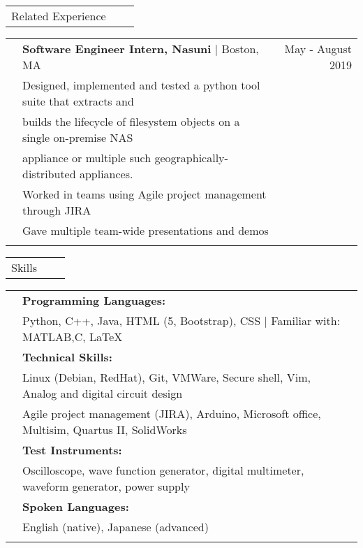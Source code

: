 \documentclass[letterpaper,10pt,oneside]{article}
\begin{document}
\noindent \begin{tabularx}{\linewidth}{@{} l l R }
     \Large{Related Experience}\\
\end{tabularx}
\noindent \begin{tabularx}{\linewidth}{@{} l l R }
     & \textbf{Software Engineer Intern, Nasuni} $\mid$ Boston, MA & May - August 2019 \\
     & Designed, implemented and tested a python tool suite that extracts and\\
     & \indent builds the lifecycle of filesystem objects on a single on-premise NAS\\
     & \indent appliance or multiple such geographically-distributed appliances.\\
     & Worked in teams using Agile project management through JIRA\\
     & Gave multiple team-wide presentations and demos\\
     \\
\end{tabularx}

 \noindent \begin{tabularx}{\linewidth}{@{} l l R } 
     \Large{Skills}\\
 \end{tabularx}
 \noindent \begin{tabularx}{\linewidth}{@{} l l l }
     &\textbf{Programming Languages:}\\
     &Python, C++, Java, HTML (5, Bootstrap), CSS $\mid$ Familiar with: MATLAB,C,  \LaTeX  \\
     &\textbf{Technical Skills:}\\
     &Linux (Debian, RedHat), Git, VMWare, Secure shell, Vim, Analog and digital circuit design\\
     &Agile project management (JIRA), Arduino, Microsoft office, Multisim, Quartus II, SolidWorks\\
     &\textbf{Test Instruments:}\\
     &Oscilloscope, wave function generator, digital multimeter, waveform generator, power supply\\
     &\textbf{Spoken Languages:}\\
     &English (native), Japanese (advanced) \\
     \\
 \end{tabularx}
\end{document}
